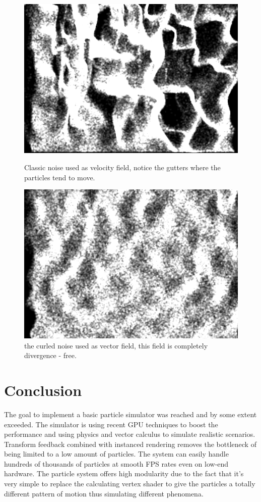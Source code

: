 \documentclass[report]{vgtc}
\begin{document}
\begin{figure}[H]
\includegraphics[scale=0.5]{img/noise.png}
\caption{Classic noise used as velocity field, notice the gutters where the particles tend to move.}
\includegraphics[scale=0.5]{img/curl-noise.png}
\caption{the curled noise used as vector field, this field is completely divergence - free.}
\end{figure}
\section{Conclusion}
The goal to implement a basic particle simulator was reached and by some extent exceeded. The simulator is using recent GPU techniques to boost the performance and using physics and vector calculus to simulate realistic scenarios. Transform feedback combined with instanced rendering removes the bottleneck of being limited to a low amount of particles. The system can easily handle hundreds of thousands of particles at smooth FPS rates even on low-end hardware. The particle system offers high modularity due to the fact that it’s very simple to replace the calculating vertex shader to give the particles a totally different pattern of motion thus simulating different phenomena.
\end{document}
